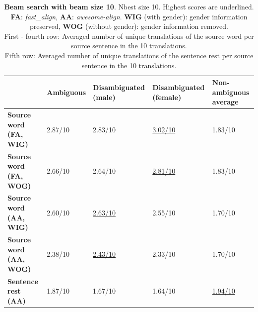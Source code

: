 \begin{table}

    \begin{subtable}{\textwidth}
        \centering
        \begin{tabularx}{\linewidth}{|X|XXXX|}
            \hline
             & \textbf{Ambiguous} & \textbf{Disambiguated (male)} & \textbf{Disambiguated (female)} & \textbf{Non-ambiguous average} \\ \hline
             \textbf{Source word (FA, WIG)} & 2.87/10 & 2.83/10 & \underline{3.02/10} & 1.83/10 \\
             \textbf{Source word (FA, WOG)} & 2.66/10 & 2.64/10 & \underline{2.81/10} & 1.83/10 \\
             \textbf{Source word (AA, WIG)} & 2.60/10 & \underline{2.63/10} & 2.55/10 & 1.70/10 \\ 
             \textbf{Source word (AA, WOG)} & 2.38/10 & \underline{2.43/10} & 2.33/10 & 1.70/10 \\\hline 
             \textbf{Sentence rest (AA)} & 1.87/10 & 1.67/10 & 1.64/10 & \underline{1.94/10} \\ \hline
        \end{tabularx}
        \caption{\textbf{Beam search with beam size 10}. Nbest size 10. Highest scores are underlined. \textbf{FA}: \textit{fast\_align}, \textbf{AA}: \textit{awesome-align}. \textbf{WIG} (with gender): gender information preserved, \textbf{WOG} (without gender): gender information removed. \\ First - fourth row: Averaged number of unique translations of the source word per source sentence in the 10 translations. \\ Fifth row: Averaged number of unique translations of the sentence rest per source sentence in the 10 translations.}
        \label{tab:alignment_translation_10}
    \end{subtable}


\end{table}
